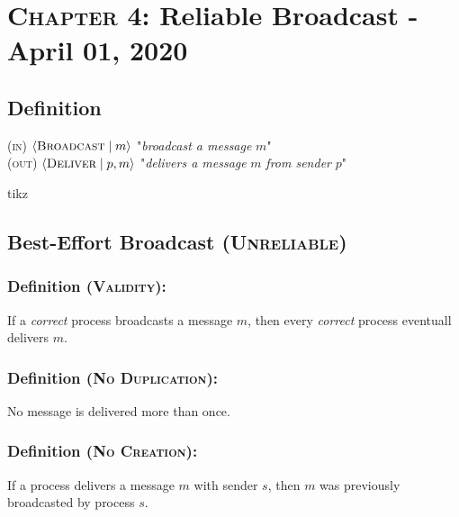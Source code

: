\documentclass{article}
\begin{document}
	\section{\textsc{Chapter} 4: Reliable Broadcast - April 01, 2020}
	\begin{adjustwidth}{2em}{2em}
		\subsection{Definition}
		\begin{adjustwidth}{2em}{2em}
			(\textsc{in}) $\langle \textsc{Broadcast} \mid m \rangle$ "\textit{broadcast a message} $m$" \\
			(\textsc{out}) $\langle \textsc{Deliver} \mid p, m \rangle$ "\textit{delivers a message} $m$ \textit{from sender} $p$" \\
			\begin{center}
				tikz
			\end{center}
		\end{adjustwidth}
		\subsection{Best-Effort Broadcast (\textsc{Unreliable})}
		\begin{adjustwidth}{2em}{2em}
			\subsubsection{Definition (\textsc{Validity}):}
			\begin{adjustwidth}{2em}{}
				If a \textit{correct} process broadcasts a message $m$, then every \textit{correct} process eventuall delivers $m$.
			\end{adjustwidth}
			\subsubsection{Definition (\textsc{No Duplication}):}
			\begin{adjustwidth}{2em}{}
				No message is delivered more than once.
			\end{adjustwidth}
			\subsubsection{Definition (\textsc{No Creation}):}
			\begin{adjustwidth}{2em}{}
				If a process delivers a message $m$ with sender $s$, then $m$ was previously broadcasted by process $s$.
			\end{adjustwidth}
		\end{adjustwidth}

\end{adjustwidth}
\end{document}
